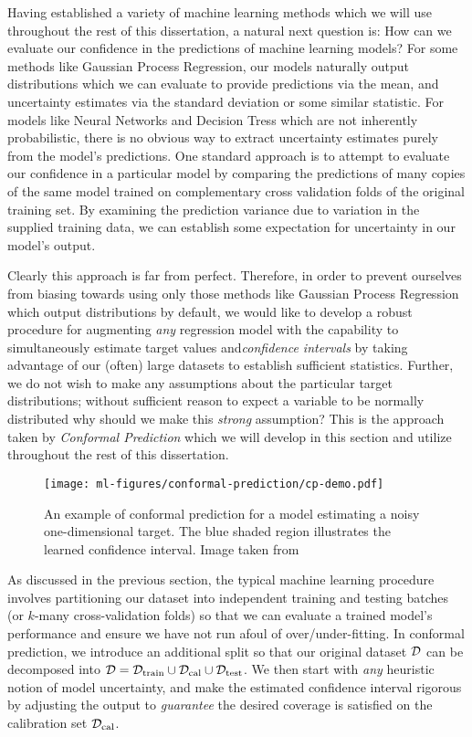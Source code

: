 Having established a variety of machine learning methods which we will use throughout the rest of this dissertation, a natural next question is: How can we evaluate our confidence in the predictions of machine learning models? For some methods like Gaussian Process Regression, our models naturally output distributions which we can evaluate to provide predictions via the mean, and uncertainty estimates via the standard deviation or some similar statistic. For models like Neural Networks and Decision Tress which are not inherently probabilistic, there is no obvious way to extract uncertainty estimates purely from the model's predictions. One standard approach is to attempt to evaluate our confidence in a particular model by comparing the predictions of many copies of the same model trained on complementary cross validation folds of the original training set. By examining the prediction variance due to variation in the supplied training data, we can establish some expectation for uncertainty in our model's output.

Clearly this approach is far from perfect. Therefore, in order to prevent ourselves from biasing towards using only those methods like Gaussian Process Regression which output distributions by default, we would like to develop a robust procedure for augmenting \textit{any} regression model with the capability to simultaneously estimate target values and\textit{confidence intervals} by taking advantage of our (often) large datasets to establish sufficient statistics. Further, we do not wish to make any assumptions about the particular target distributions; without sufficient reason to expect a variable to be normally distributed why should we make this \textit{strong} assumption? This is the approach taken by \textit{Conformal Prediction} which we will develop in this section and utilize throughout the rest of this dissertation. 

\begin{figure}[h]
  \centering
  \texttt{[image: ml-figures/conformal-prediction/cp-demo.pdf]}
  \caption{An example of conformal prediction for a model estimating a noisy one-dimensional target. The blue shaded region illustrates the learned confidence interval. Image taken from  \cite{conformalprediction.jl}}
\end{figure}


As discussed in the previous section, the typical machine learning procedure involves partitioning our dataset into independent training and testing batches (or $k$-many cross-validation folds) so that we can evaluate a trained model's performance and ensure we have not run afoul of over/under-fitting. In conformal prediction, we introduce an additional split so that our original dataset $\mathcal{D}$ can be decomposed into $\mathcal{D} = \mathcal{D}_{\text{train}}\cup \mathcal{D}_{\text{cal}} \cup \mathcal{D}_{\text{test}}$. We then start with \textit{any} heuristic notion of model uncertainty, and make the estimated confidence interval rigorous by adjusting the output to \textit{guarantee} the desired coverage is satisfied on the calibration set $\mathcal{D}_{\text{cal}}$.

